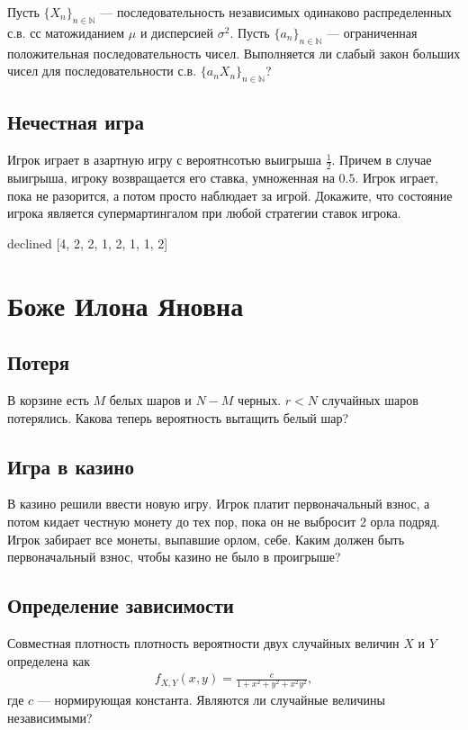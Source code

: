 \documentclass[12pt]{article}
\newcommand\N{\mathbb{N}}
\begin{document}
Пусть $\{X_n\}_{n \in \N}$ --- последовательность независимых одинаково распределенных с.в. сс матожиданием $\mu$ и дисперсией $\sigma^2$. Пусть $\{a_n\}_{n \in \N}$ --- ограниченная положительная последовательность чисел. Выполняется ли слабый закон больших чисел для последовательности с.в. $\{a_n X_n\}_{n \in \N}$?



\subsection{Нечестная игра}

Игрок играет в азартную игру с вероятнсотью выигрыша $\frac{1}{2}$. Причем в случае выигрыша, игроку возвращается его ставка, умноженная на $0.5$. Игрок играет, пока не разорится, а потом просто наблюдает за игрой. Докажите, что состояние игрока является супермартингалом при любой стратегии ставок игрока.



\newpage
declined  [4, 2, 2, 1, 2, 1, 1, 2]
\section{Боже Илона Яновна}

\subsection{Потеря}

В корзине есть $M$ белых шаров и $N - M$ черных. $r < N$ случайных шаров потерялись. Какова теперь вероятность вытащить белый шар?



\subsection{Игра в казино}

В казино решили ввести новую игру. Игрок платит первоначальный взнос, а потом кидает честную монету до тех пор, пока он не выбросит 2 орла подряд. Игрок забирает все монеты, выпавшие орлом, себе. Каким должен быть первоначальный взнос, чтобы казино не было в проигрыше?



\subsection{Определение зависимости}

Совместная плотность плотность вероятности двух случайных величин $X$ и $Y$ определена как
\begin{align*}
    f_{X, Y}(x, y) = \frac{c}{1 + x^2 + y^2 + x^2y^2},
\end{align*}
где $c$ --- нормирующая константа. Являются ли случайные величины независимыми?
\end{document}
